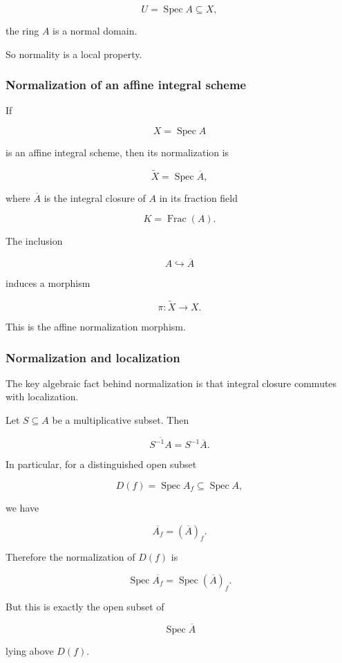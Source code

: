 \documentclass[12pt,a4paper]{article}
\theoremstyle{notespace}
\begin{document}
\[
U=\operatorname{Spec}A\subseteq X,
\]

the ring \(A\) is a normal domain.

So normality is a local property.

\subsubsection{Normalization of an affine integral scheme}

If

\[
X=\operatorname{Spec}A
\]

is an affine integral scheme, then its normalization is

\[
\widetilde{X}=\operatorname{Spec}\overline{A},
\]

where \(\overline{A}\) is the integral closure of \(A\) in its fraction field

\[
K=\operatorname{Frac}(A).
\]

The inclusion

\[
A\hookrightarrow \overline{A}
\]

induces a morphism

\[
\pi:\widetilde{X}\to X.
\]

This is the affine normalization morphism.

\subsubsection{Normalization and localization}

The key algebraic fact behind normalization is that integral closure commutes with localization.

Let \(S\subseteq A\) be a multiplicative subset. Then

\[
\overline{S^{-1}A}=S^{-1}\overline{A}.
\]

In particular, for a distinguished open subset

\[
D(f)=\operatorname{Spec}A_f\subseteq \operatorname{Spec}A,
\]

we have

\[
\overline{A_f}=(\overline{A})_f.
\]

Therefore the normalization of \(D(f)\) is

\[
\operatorname{Spec}\overline{A_f}
=
\operatorname{Spec}(\overline{A})_f.
\]

But this is exactly the open subset of

\[
\operatorname{Spec}\overline{A}
\]

lying above \(D(f)\).
\end{document}
